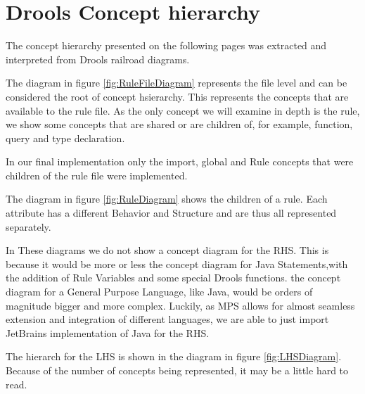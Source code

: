 \chapter{Drools Concept hierarchy}
\label{appendix:DroolsConceptHierarchy}

The concept hierarchy presented on the following pages was extracted and interpreted from Drools railroad diagrams.

The diagram in figure \ref{fig:RuleFileDiagram} represents the file level and can be considered the root of concept hsierarchy.
This represents the concepts that are available to the rule file.
As the only concept we will examine in depth is the rule, we show some concepts that are shared or are children of, for example, function, query and type declaration.

In our final implementation only the import, global and Rule concepts that were children of the rule file were implemented.

The diagram in figure \ref{fig:RuleDiagram} shows the children of a rule.
Each attribute has a different Behavior and Structure and are thus all represented separately.

In These diagrams we do not show a concept diagram for the RHS.
This is because it would be more or less the concept diagram for Java Statements,with the addition of Rule Variables and some special Drools functions.
the concept diagram for a General Purpose Language, like Java, would be orders of magnitude bigger and more complex.
Luckily, as MPS allows for almost seamless extension and integration of different languages, we are able to just import JetBrains implementation of Java for the RHS.

The hierarch for the LHS is shown in the diagram in figure \ref{fig:LHSDiagram}.
Because of the number of concepts being represented, it may be a little hard to read.

